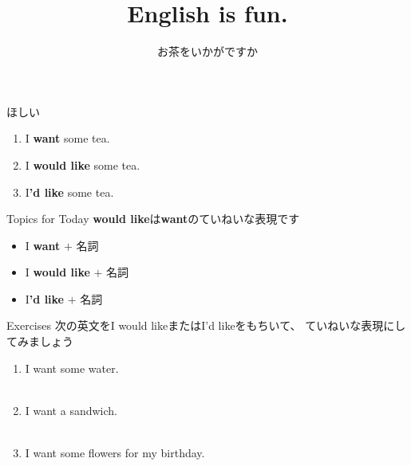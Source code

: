 \documentclass[aspectratio=169,xcolor={dvipsnames,table}]{beamer}
\title{English is fun.}
\subtitle{お茶をいかがですか}
\author{}
\institute[]{}
\date[]
\begin{document}
\begin{frame}[plain]
  \titlepage
\end{frame}


\begin{frame}[plain]{ほしい}
\large
 \begin{enumerate}
  \item I \textbf{want} some tea.
  \item I \textbf{would like} some tea.
  \item I{\bfseries 'd like} some tea.
 \end{enumerate}

\begin{block}{Topics for Today}\small
\textbf{would like}は\textbf{want}のていねいな表現です
\begin{itemize}[square]\small
 \item I \textbf{want} $+$ 名詞
 \item I \textbf{would like} $+$ 名詞
 \item I\textbf{'d like} $+$ 名詞
       \end{itemize}
\end{block}

\hfill{\scriptsize {}}
\end{frame}
\begin{frame}[plain]{Exercises}
次の英文をI would likeまたはI'd likeをもちいて、 ていねいな表現にしてみましょう
 \begin{enumerate}
  \item I want some water.\\
\\
  \item I want a sandwich.\\
\\
  \item I want some flowers for my birthday.\\
\\
 \end{enumerate}

\hfill{\scriptsize {}}

\end{frame}
\end{document}
